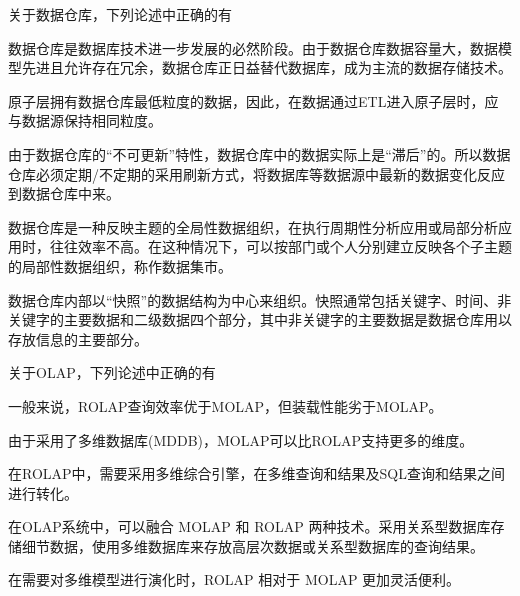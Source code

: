 \begin{problem}
关于数据仓库，下列论述中正确的有
\myline
\begin{compactenum}[A.]
    \item 数据仓库是数据库技术进一步发展的必然阶段。由于数据仓库数据容量大，数据模型先进且允许存在冗余，数据仓库正日益替代数据库，成为主流的数据存储技术。
    \item 原子层拥有数据仓库最低粒度的数据，因此，在数据通过ETL进入原子层时，应与数据源保持相同粒度。
    \item 由于数据仓库的“不可更新”特性，数据仓库中的数据实际上是“滞后”的。所以数据仓库必须定期/不定期的采用刷新方式，将数据库等数据源中最新的数据变化反应到数据仓库中来。
    \item 数据仓库是一种反映主题的全局性数据组织，在执行周期性分析应用或局部分析应用时，往往效率不高。在这种情况下，可以按部门或个人分别建立反映各个子主题的局部性数据组织，称作数据集市。
    \item 数据仓库内部以“快照”的数据结构为中心来组织。快照通常包括关键字、时间、非关键字的主要数据和二级数据四个部分，其中非关键字的主要数据是数据仓库用以存放信息的主要部分。
\end{compactenum}
\end{problem}


\begin{problem}
关于OLAP，下列论述中正确的有
\myline
\begin{compactenum}[A.]
    \item 一般来说，ROLAP查询效率优于MOLAP，但装载性能劣于MOLAP。
    \item 由于采用了多维数据库(MDDB)，MOLAP可以比ROLAP支持更多的维度。
    \item 在ROLAP中，需要采用多维综合引擎，在多维查询和结果及SQL查询和结果之间进行转化。
    \item 在OLAP系统中，可以融合 MOLAP 和 ROLAP 两种技术。采用关系型数据库存储细节数据，使用多维数据库来存放高层次数据或关系型数据库的查询结果。
    \item 在需要对多维模型进行演化时，ROLAP 相对于 MOLAP 更加灵活便利。
\end{compactenum}
\end{problem}


